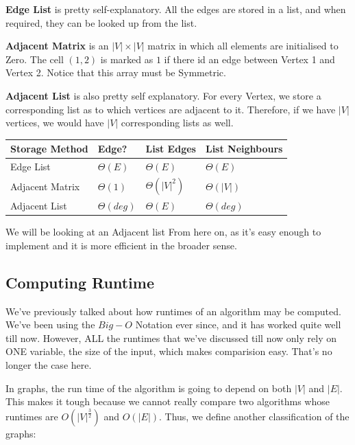 \documentclass{article}
\theoremstyle{definition}
\theoremstyle{example}
\begin{document}
\textbf{Edge List} is pretty self-explanatory. All the edges are stored in a list, and when required, they can be looked up from the list.\par
\vspace{4mm}
\textbf{Adjacent Matrix} is an $|V|\times |V|$ matrix in which all elements are initialised to Zero. The cell $(1, 2)$ is marked as $1$ if there id an edge between Vertex 1 and Vertex 2. Notice that this array must be Symmetric.\par
\vspace{4mm}
\textbf{Adjacent List} is also pretty self explanatory. For every Vertex, we store a corresponding list as to which vertices are adjacent to it. Therefore, if we have $|V|$ vertices, we would have $|V|$ corresponding lists as well.
\vspace{6mm}
\begin{center}
 \begin{tabular}{| m{8em} | m{5em} | m{6em} | m{8em} |} 
 \hline
 \textbf{Storage Method} & \textbf{Edge?} & \textbf{List Edges} & \textbf{List Neighbours} \\ [0.5ex] 
 \hline
 Edge List & $\Theta (E)$ & $\Theta (E)$ & $\Theta (E)$ \\ 
 \hline
 Adjacent Matrix & $\Theta (1)$ & $\Theta (|V|^2)$ & $\Theta (|V|)$ \\
 \hline
 Adjacent List & $\Theta (deg)$ & $\Theta (E)$ & $\Theta (deg)$ \\
 \hline
 \end{tabular}
\end{center}

We will be looking at an Adjacent list From here on, as it's easy enough to implement and it is more efficient in the broader sense.\newpage

\subsection{\Large Computing Runtime}
\hspace{4mm} We've previously talked about how runtimes of an algorithm may be computed. We've been using the $Big-O$ Notation ever since, and it has worked quite well till now. However, ALL the runtimes that we've discussed till now only rely on ONE variable, the size of the input, which makes comparision easy. That's no longer the case here.\par
\vspace{4mm}
In graphs, the run time of the algorithm is going to depend on both $|V|$ and $|E|$. This makes it tough because we cannot really compare two algorithms whose runtimes are $O(|V|^{\frac{3}{2}})$ and $O(|E|)$. Thus, we define another classification of the graphs:
\end{document}

